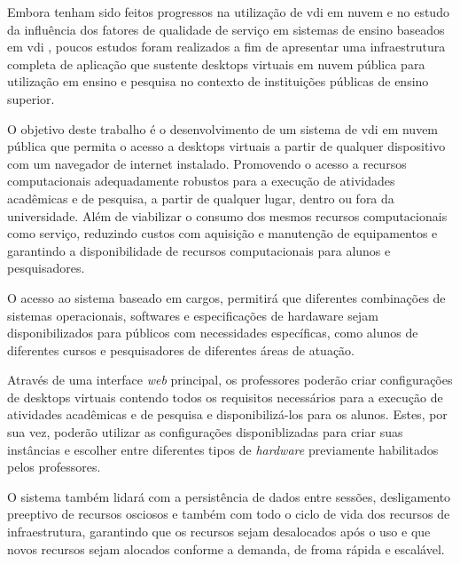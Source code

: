 Embora tenham sido feitos progressos na utilização de \gls{vdi} em nuvem e no estudo da influência dos fatores de qualidade de serviço em sistemas de ensino baseados em \gls{vdi} \citep{qoselearning}, poucos estudos foram realizados a fim de apresentar uma infraestrutura completa de aplicação que sustente \glspl{desktop} virtuais em nuvem pública para utilização em ensino e pesquisa no contexto de instituições públicas de ensino superior.

O objetivo deste trabalho é o desenvolvimento de um sistema de \gls{vdi} em nuvem pública que permita o acesso a \glspl{desktop} virtuais a partir de qualquer dispositivo com um navegador de internet instalado. Promovendo o acesso a recursos computacionais adequadamente robustos para a execução de atividades acadêmicas e de pesquisa, a partir de qualquer lugar, dentro ou fora da universidade. Além de viabilizar o consumo dos mesmos recursos computacionais como serviço, reduzindo custos com aquisição e manutenção de equipamentos e garantindo a disponibilidade de recursos computacionais para alunos e pesquisadores.

O acesso ao sistema baseado em cargos, permitirá que diferentes combinações de sistemas operacionais, softwares e especificações de hardaware sejam disponibilizados para públicos com necessidades específicas, como alunos de diferentes cursos e pesquisadores de diferentes áreas de atuação.

Através de uma interface \textit{web} principal, os professores poderão criar configurações de \glspl{desktop} virtuais contendo todos os requisitos necessários para a execução de atividades acadêmicas e de pesquisa e disponibilizá-los para os alunos. Estes, por sua vez, poderão utilizar as configurações disponiblizadas para criar suas instâncias e escolher entre diferentes tipos de \textit{hardware} previamente habilitados pelos professores.

O sistema também lidará com a persistência de dados entre sessões, desligamento preeptivo de recursos osciosos e também com todo o ciclo de vida dos recursos de infraestrutura, garantindo que os recursos sejam desalocados após o uso e que novos recursos sejam alocados conforme a demanda, de froma rápida e escalável.



